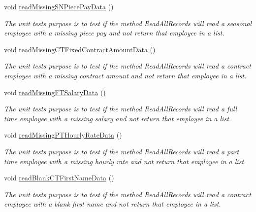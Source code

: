 \begin{DoxyCompactItemize}
void \hyperlink{class_file_i_o_tests_1_1_file_i_o_tests_ab3a9ef6366aef8c51026210a0ae0d8a0}{read\+Missing\+S\+N\+Piece\+Pay\+Data} ()
\begin{DoxyCompactList}\small\item\em The unit test\textquotesingle{}s purpose is to test if the method Read\+All\+Records will read a seasonal employee with a missing piece pay and not return that employee in a list. \end{DoxyCompactList}\item 
void \hyperlink{class_file_i_o_tests_1_1_file_i_o_tests_a849aa3c00169f82086afff072939fd9e}{read\+Missing\+C\+T\+Fixed\+Contract\+Amount\+Data} ()
\begin{DoxyCompactList}\small\item\em The unit test\textquotesingle{}s purpose is to test if the method Read\+All\+Records will read a contract employee with a missing contract amount and not return that employee in a list. \end{DoxyCompactList}\item 
void \hyperlink{class_file_i_o_tests_1_1_file_i_o_tests_a2b3560b4645c79de49974863cc5c7a52}{read\+Missing\+F\+T\+Salary\+Data} ()
\begin{DoxyCompactList}\small\item\em The unit test\textquotesingle{}s purpose is to test if the method Read\+All\+Records will read a full time employee with a missing salary and not return that employee in a list. \end{DoxyCompactList}\item 
void \hyperlink{class_file_i_o_tests_1_1_file_i_o_tests_a4d7449a49e50d385fdeb0ee8d346129a}{read\+Missing\+P\+T\+Hourly\+Rate\+Data} ()
\begin{DoxyCompactList}\small\item\em The unit test\textquotesingle{}s purpose is to test if the method Read\+All\+Records will read a part time employee with a missing hourly rate and not return that employee in a list. \end{DoxyCompactList}\item 
void \hyperlink{class_file_i_o_tests_1_1_file_i_o_tests_a1484a98ad13a6bcc1f428305a44c0329}{read\+Blank\+C\+T\+First\+Name\+Data} ()
\begin{DoxyCompactList}\small\item\em The unit test\textquotesingle{}s purpose is to test if the method Read\+All\+Records will read a contract employee with a blank first name and not return that employee in a list. \end{DoxyCompactList}\item 

\end{DoxyCompactItemize}
